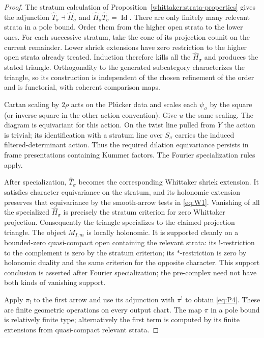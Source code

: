\documentclass[11pt]{article}
\numberwithin{equation}{section}
\theoremstyle{definition}
\theoremstyle{remark}
\begin{document}
\begin{proof}
The stratum calculation of
Proposition~\ref{whittaker:strata-properties} gives the adjunction
$\widehat T_\sigma\dashv\widehat H_\sigma$ and
$\widehat H_\sigma\widehat T_\sigma=\operatorname{Id}$.
There are only finitely many relevant strata in a pole bound.
Order them from the higher open strata to the lower ones.
For each successive stratum, take the cone of its projection
counit on the current remainder.  Lower shriek extensions have
zero restriction to the higher open strata already treated.
Induction therefore kills all the $\widehat H_\sigma$ and
produces the stated triangle.  Orthogonality to the generated
subcategory characterizes the triangle, so its construction is
independent of the chosen refinement of the order and is
functorial, with coherent comparison maps.

Cartan scaling by $2\rho$ acts on the Pl\"ucker data and scales
each $\psi_\sigma$ by the square (or inverse square in the other
action convention).  Give $u$ the same scaling.  The diagram is
equivariant for this action.  On the twist line pulled from $Y$
the action is trivial; its identification with a stratum line
over $S_\sigma$ carries the induced filtered-determinant action.
Thus the required dilation equivariance persists in frame
presentations containing Kummer factors.  The Fourier
specialization rules apply.

After specialization, $\widehat T_\sigma$ becomes the corresponding
Whittaker shriek extension.  It satisfies character equivariance
on the stratum, and its holonomic extension preserves that
equivariance by the smooth-arrow tests in \eqref{eq:W1}.
Vanishing of all the specialized $\widehat H_\sigma$ is precisely
the stratum criterion for zero Whittaker projection.
Consequently the triangle specializes to the claimed projection
triangle.  The object $M_{I,m}$ is locally holonomic.  It is
supported cleanly on a bounded-zero quasi-compact open containing
the relevant strata: its $!$-restriction to the complement is
zero by the stratum criterion; its $*$-restriction is zero by
holonomic duality and the same criterion for the opposite
character.  This support conclusion is asserted after Fourier
specialization; the pre-complex need not have both kinds of
vanishing support.

Apply $\pi_!$ to the first arrow and use its adjunction with
$\pi^!$ to obtain \eqref{eq:P4}.  These are finite geometric
operations on every output chart.  The map $\pi$ in a pole
bound is relatively finite type; alternatively the first term
is computed by its finite extensions from quasi-compact
relevant strata.


\end{proof}
\end{document}
